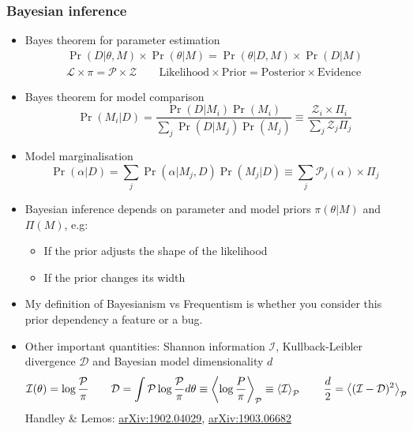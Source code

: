 \documentclass[%
    9pt,
]{beamer}
\newcommand{\red}[1]{\textcolor{cambblue}{#1}}
\newcommand{\arxiv}[1]{\href{https://arxiv.org/abs/#1}{arXiv:#1}}
\begin{document}
\begin{frame}
    \frametitle{Bayesian inference}
    \begin{itemize}
        \item Bayes theorem for parameter estimation
            \begin{gather}
                \Pr(D|\theta,M) \times \Pr(\theta|M) = \Pr(\theta|D,M) \times \Pr(D|M) \nonumber\\
                    \mathcal{L}\times\pi = \mathcal{P}\times \mathcal{Z} \qquad
                \mathrm{Likelihood}\times \mathrm{Prior} = \mathrm{Posterior}\times \mathrm{Evidence}\nonumber
            \end{gather}
                \vspace{-15pt}
        \item Bayes theorem for model comparison
            \[
                \Pr(M_i|D) = \frac{\Pr(D|M_i)\Pr(M_i)}{\sum_j \Pr(D|M_j)\Pr(M_j)} \equiv \frac{\mathcal{Z}_i\times\Pi_i}{\sum_j \mathcal{Z}_j\Pi_j}
            \]
            \vspace{-10pt}
        \item Model marginalisation
            \[
                \Pr(\alpha|D) = \sum_j \Pr(\alpha|M_j,D) \Pr(M_j|D) \equiv \sum_j \mathcal{P}_j(\alpha) \times \Pi_j
            \]
            \vspace{-5pt}
        \item Bayesian inference depends on parameter and model priors $\pi(\theta|M)$ and $\Pi(M)$, e.g:
            \begin{itemize}
                \item If the prior adjusts the shape of the likelihood
                \item If the prior changes its width
            \end{itemize}
        \item My definition of \red{Bayesianism} vs \red{Frequentism} is whether you consider this prior dependency a \red{feature} or a \red{bug}.
        \item Other important quantities: Shannon information $\mathcal{I}$, Kullback-Leibler divergence $\mathcal{D}$ and Bayesian model dimensionality $d$ 
            \[
                \mathcal{I}(\theta) = \log \frac{\mathcal{P}}{\pi} \qquad
                \mathcal{D} = \int \mathcal{P} \log \frac{\mathcal{P}}{\pi} d\theta \equiv \left\langle \log \frac{P}{\pi}\right\rangle_\mathcal{P} \equiv \left\langle \mathcal{I} \right\rangle_\mathcal{P} \qquad
                \frac{d}{2} = \left\langle (\mathcal{I}-\mathcal{D})^2\right\rangle_\mathcal{P} \hfill
            \] 
            Handley \& Lemos: \arxiv{1902.04029},   \arxiv{1903.06682}
            
    \end{itemize}
\end{frame}
\end{document}
